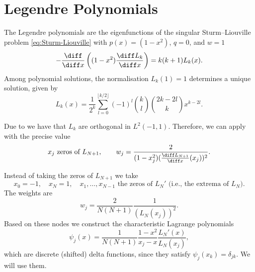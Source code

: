 \section{Legendre Polynomials}
The Legendre polynomials are the eigenfunctions of the singular Sturm--Liouville problem \eqref{eq:Sturm-Liouville} with $p(x) = (1-x^2)$, $q = 0$, and $w = 1$
\begin{equation*}
    -\frac{\diff}{\diff x} \left( (1-x^2) \frac{\diff L_k}{\diff x} \right) = k(k+1) L_k(x).
\end{equation*}
Among polynomial solutions, the normalisation $L_k(1)=1$ determines a unique solution, given by
\begin{equation*}
    L_{k}(x) = \frac 1 {2^k} \sum_{l=0}^{\lfloor k / 2 \rfloor} (-1)^l \binom{k}{l} \binom{2k-2l}{k} x^{k-2l} .
\end{equation*}

\begin{example}
    Due to  we have that $L_k$ are orthogonal in $L^2(-1,1)$. Therefore, we can apply  with the precise value
    \begin{equation*}
        x_j \text{ zeros of } L_{N+1}, \qquad w_j = \frac{2}{(1-x_j^2)(\frac{\diff L_{N+1}}{\diff x}(x_j))^2}.
    \end{equation*}
\end{example}

\begin{example}
    Instead of taking the zeros of $L_{N+1}$ we take
    \begin{equation*}
        x_0 = -1, \quad x_N = 1, \quad x_1, \dots, x_{N-1} \text{ the zeros of } L_N' \text{ (i.e., the extrema of } L_N \text{)}.
    \end{equation*}
    The weights are
    \begin{equation*}
        w_j = \frac{2}{N(N+1)} \frac{1}{(L_N(x_j))^2}.
    \end{equation*}
    Based on these nodes we construct the characteristic Lagrange polynomials
    \begin{equation*}
        \psi_j (x) = \frac{1}{N(N+1)} \frac{1-x^2}{x_j - x} \frac{L_N'(x)}{L_N(x_j)},
    \end{equation*}
    which are discrete (shifted) delta functions, since they satisfy $\psi_j (x_k) = \delta_{jk}$. We will use them.
\end{example}

